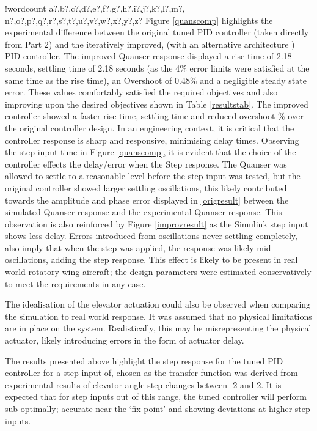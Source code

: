 \documentclass[11pt]{article}
\newcounter{words}
\newenvironment{counted}{%
  \setcounter{words}{0}
  \SearchList!{wordcount}{\stepcounter{words}}
    {a?,b?,c?,d?,e?,f?,g?,h?,i?,j?,k?,l?,m?,
    n?,o?,p?,q?,r?,s?,t?,u?,v?,w?,x?,y?,z?}
  \UndoBoundary{'}
  \SearchOrder{p;}}{%
  \StopSearching}
\begin{document}
\begin{counted}
Figure \ref{quanscomp} highlights the experimental difference between
the original tuned PID controller (taken directly from Part 2) and the
iteratively improved, (with an alternative architecture ) PID
controller. The improved Quanser response displayed a rise time of 2.18
seconds, settling time of 2.18 seconds (as the 4\% error limits were
satisfied at the same time as the rise time), an Overshoot of 0.48\% and
a negligible steady state error. These values comfortably satisfied the
required objectives and also improving upon the desired objectives shown
in Table \ref{resultstab}. The improved controller showed a faster rise
time, settling time and reduced overshoot \% over the original
controller design. In an engineering context, it is critical that the
controller response is sharp and responsive, minimising delay times.
Observing the step input time in Figure \ref{quanscomp}, it is evident
that the choice of the controller effects the delay/error when the Step
response. The Quanser was allowed to settle to a reasonable level before
the step input was tested, but the original controller showed larger
settling oscillations, this likely contributed towards the amplitude and
phase error displayed in \ref{origresult} between the simulated Quanser
response and the experimental Quanser response. This observation is also
reinforced by Figure \ref{improvresult} as the Simulink step input shows
less delay. Errors introduced from oscillations never settling
completely, also imply that when the step was applied, the response was
likely mid oscillations, adding the step response. This effect is likely
to be present in real world rotatory wing aircraft; the design
parameters were estimated conservatively to meet the requirements in any
case.

The idealisation of the elevator actuation could also be observed when
comparing the simulation to real world response. It was assumed that no
physical limitations are in place on the system. Realistically, this may
be misrepresenting the physical actuator, likely introducing errors in
the form of actuator delay.

The results presented above highlight the step response for the tuned
PID controller for a step input of, chosen as the transfer function was
derived from experimental results of elevator angle step changes between
-2 and 2. It is expected that for step inputs out of this range, the
tuned controller will perform sub-optimally; accurate near the
`fix-point' and showing deviations at higher step inputs.


\end{counted}
\end{document}
